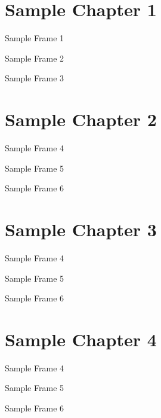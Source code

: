 \documentclass[../main.tex]{subfiles}
\begin{document}
    \section{Sample Chapter 1}
    \begin{frame}{Sample Frame 1}
        
    \end{frame}

    \begin{frame}{Sample Frame 2}
        
    \end{frame}

    \begin{frame}{Sample Frame 3}
        
    \end{frame}

    \section{Sample Chapter 2}
    \begin{frame}{Sample Frame 4}
        
    \end{frame}

    \begin{frame}{Sample Frame 5}
        
    \end{frame}

    \begin{frame}{Sample Frame 6}
        
    \end{frame}

    \section{Sample Chapter 3}
    \begin{frame}{Sample Frame 4}
        
    \end{frame}

    \begin{frame}{Sample Frame 5}
        
    \end{frame}

    \begin{frame}{Sample Frame 6}
        
    \end{frame}

    \section{Sample Chapter 4}
    \begin{frame}{Sample Frame 4}
        
    \end{frame}

    \begin{frame}{Sample Frame 5}
        
    \end{frame}

    \begin{frame}{Sample Frame 6}
        
    \end{frame}
    
\end{document}
